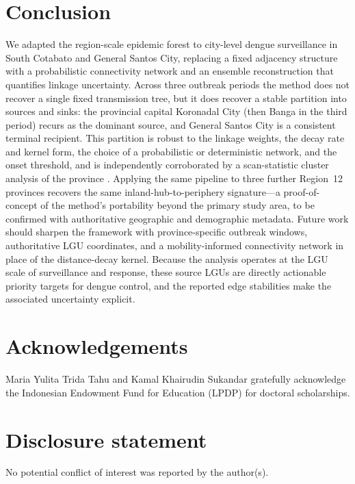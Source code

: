 \documentclass[a4paper,11pt]{article}
\begin{document}
\section{Conclusion}
We adapted the region-scale epidemic forest to city-level dengue surveillance in
South Cotabato and General Santos City, replacing a fixed adjacency structure with
a probabilistic connectivity network and an ensemble reconstruction that
quantifies linkage uncertainty. Across three outbreak periods the method does not
recover a single fixed transmission tree, but it does recover a stable partition
into sources and sinks: the provincial capital Koronadal City (then Banga in the
third period) recurs as the dominant source, and General Santos City is a
consistent terminal recipient. This partition is robust to the linkage weights, the
decay rate and kernel form, the choice of a probabilistic or deterministic network,
and the onset threshold, and is independently corroborated by a scan-statistic
cluster analysis of the province \cite{Ygona2025}. Applying the same pipeline to
three further Region~12 provinces recovers the same inland-hub-to-periphery
signature---a proof-of-concept of the method's portability beyond the primary study
area, to be confirmed with authoritative geographic and demographic metadata. Future
work should sharpen the framework with province-specific outbreak windows,
authoritative LGU coordinates, and a mobility-informed connectivity network in place
of the distance-decay kernel.
Because the analysis operates at the LGU scale of surveillance and response, these
source LGUs are directly actionable priority targets for dengue control, and the
reported edge stabilities make the associated uncertainty explicit.

\section*{Acknowledgements}
Maria Yulita Trida Tahu and Kamal Khairudin Sukandar gratefully acknowledge the
Indonesian Endowment Fund for Education (LPDP) for doctoral scholarships.

\section*{Disclosure statement}
No potential conflict of interest was reported by the author(s).
\end{document}

